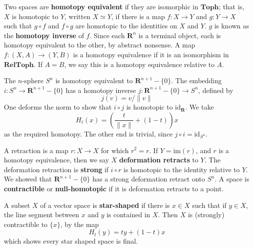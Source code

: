 Two spaces are {\bf homotopy equivalent} if they are isomorphic in $\textbf{Toph}$; that is, $X$ is homotopic to $Y$, written $X \simeq Y$, if there is a map $f:X \to Y$ and $g: Y \to X$ such that $g \circ f$ and $f \circ g$ are homotopic to the identities on $X$ and $Y$. $g$ is known as the {\bf homotopy inverse} of $f$. Since each $\mathbf{R}^n$ is a terminal object, each is homotopy equivalent to the other, by abstract nonsense. A map $f: (X,A) \to (Y,B)$ is a homotopy equivalence if it is an isomorphism in $\textbf{RelToph}$. If $A = B$, we say this is a homotopy equivalence relative to $A$.

\begin{example}
    The $n$-sphere $S^n$ is homotopy equivalent to $\mathbf{R}^{n+1} - \{ 0 \}$. The embedding $i: S^n \to \mathbf{R}^{n+1} - \{ 0 \}$ has a homotopy inverse $j: \mathbf{R}^{n+1} - \{ 0 \} \to S^n$, defined by
    \[ j(v) = v/\|v\| \]
    One deforms the norm to show that $i \circ j$ is homotopic to $\text{id}_{\mathbf{R}}$. We take
    \[ H_t(x) = \left( \frac{t}{\| x \|} + (1 - t) \right) x \]
    as the required homotopy. The other end is trivial, since $j \circ i = \text{id}_{S^n}$.
\end{example}

A retraction is a map $r:X \to X$ for which $r^2 = r$. If $Y = \text{im}(r)$, and $r$ is a homotopy equivalence, then we say $X$ {\bf deformation retracts} to $Y$. The deformation retraction is {\bf strong} if $i \circ r$ is homotopic to the identity relative to $Y$. We showed that $\mathbf{R}^{n+1} - \{ 0 \}$ has a strong deformation retract onto $S^n$. A space is {\bf contractible} or {\bf null-homotopic} if it is deformation retracts to a point.

\begin{example}
    A subset $X$ of a vector space is {\bf star-shaped} if there is $x \in X$ such that if $y \in X$, the line segment between $x$ and $y$ is contained in $X$. Then $X$ is (strongly) contractible to $\{ x \}$, by the map
    \[ H_t(y) = ty + (1 - t)x \]
    which shows every star shaped space is final.
\end{example}

